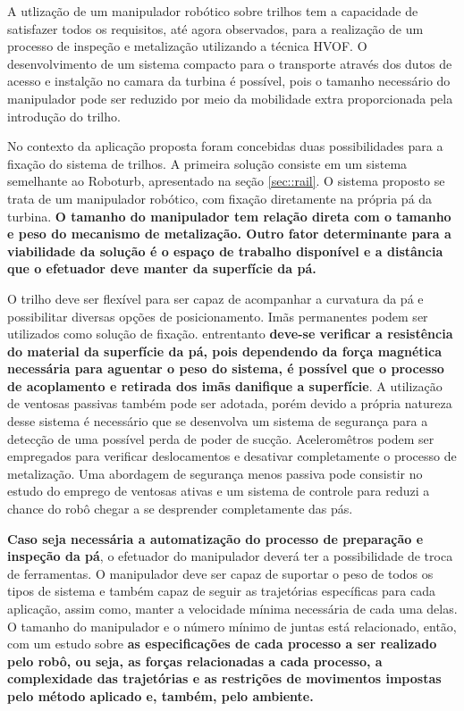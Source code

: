 
 
A utlização de um manipulador robótico sobre trilhos tem a capacidade de
satisfazer todos os requisitos, até agora observados, para a realização de um
processo de inspeção e metalização utilizando a técnica HVOF. O desenvolvimento
de um sistema compacto para o transporte através dos dutos de acesso e instalção
no camara da turbina é possível, pois o tamanho necessário do manipulador pode
ser reduzido por meio da mobilidade extra proporcionada pela introdução do
trilho.

No contexto da aplicação proposta foram concebidas duas possibilidades para a
fixação do sistema de trilhos. A primeira solução consiste em um sistema
semelhante ao Roboturb, apresentado na seção \ref{sec::rail}. O sistema proposto
se trata de um manipulador robótico, com fixação diretamente na própria pá da
turbina. \textbf{O tamanho do manipulador tem relação direta com o tamanho e
peso do mecanismo de metalização. Outro fator determinante para a viabilidade da
solução é o espaço de trabalho disponível e a distância que o efetuador deve
manter da superfície da pá.}

O trilho deve ser flexível para ser capaz de acompanhar a curvatura da pá e
possibilitar diversas opções de posicionamento. Imãs permanentes podem ser
utilizados como solução de fixação. entrentanto \textbf{deve-se verificar a
resistência do material da superfície da pá, pois dependendo da força magnética
necessária para aguentar o peso do sistema, é possível que o processo de
acoplamento e retirada dos imãs danifique a superfície}. A utilização de
ventosas passivas também pode ser adotada, porém devido a própria natureza desse
sistema é necessário que se desenvolva um sistema de segurança para a detecção
de uma possível perda de poder de sucção. Aceleromêtros podem ser empregados
para verificar deslocamentos e desativar completamente o processo de
metalização. Uma abordagem de segurança menos passiva pode consistir no estudo
do emprego de ventosas ativas e um sistema de controle para reduzi a chance do
robô chegar a se desprender completamente das pás.

\textbf{Caso seja necessária a automatização do processo de preparação e
inspeção da pá}, o efetuador do manipulador deverá ter a possibilidade de troca 
de ferramentas. O manipulador deve ser capaz de suportar o peso de todos os
tipos de sistema e também capaz de seguir as trajetórias específicas para cada
aplicação, assim como, manter a velocidade mínima necessária de cada uma delas.
O tamanho do manipulador e o número mínimo de juntas está relacionado, então,
com um estudo sobre \textbf{as especificações de cada processo a ser realizado
pelo robô, ou seja, as forças relacionadas a cada processo, a complexidade das
trajetórias e as restrições de movimentos impostas pelo método aplicado e,
também, pelo ambiente.}

